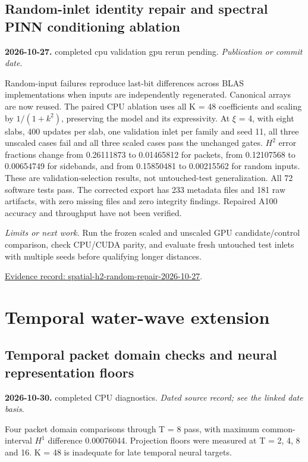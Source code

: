 \documentclass[11pt]{article}
\begin{document}
\subsection*{Random-inlet identity repair and spectral PINN conditioning ablation}
\noindent\textbf{2026-10-27.} completed cpu validation gpu rerun pending. \emph{Publication or commit date}.\par
Random-input failures reproduce last-bit differences across BLAS implementations when inputs are independently regenerated. Canonical arrays are now reused. The paired CPU ablation uses all K = 48 coefficients and scaling by $1/(1+k^2)$, preserving the model and its expressivity. At $\xi$ = 4, with eight slabs, 400 updates per slab, one validation inlet per family and seed 11, all three unscaled cases fail and all three scaled cases pass the unchanged gates. $H^2$ error fractions change from 0.26111873 to 0.01465812 for packets, from 0.12107568 to 0.00654749 for sidebands, and from 0.15850481 to 0.00215562 for random inputs. These are validation-selection results, not untouched-test generalization. All 72 software tests pass. The corrected export has 233 metadata files and 181 raw artifacts, with zero missing files and zero integrity findings. Repaired A100 accuracy and throughput have not been verified.

\noindent\textit{Limits or next work.} Run the frozen scaled and unscaled GPU candidate/control comparison, check CPU/CUDA parity, and evaluate fresh untouched test inlets with multiple seeds before qualifying longer distances.

\noindent\href{https://github.com/matasvai/dysthe-paper/blob/codex/research-record-2026-11-05/research-record/2026-11-05/README.md#spatial-h2-random-repair-2026-10-27}{Evidence record: spatial-h2-random-repair-2026-10-27}.

\section{Temporal water-wave extension}
\subsection*{Temporal packet domain checks and neural representation floors}
\noindent\textbf{2026-10-30.} completed CPU diagnostics. \emph{Dated source record; see the linked date basis}.\par
Four packet domain comparisons through T = 8 pass, with maximum common-interval $H^1$ difference 0.00076044. Projection floors were measured at T = 2, 4, 8 and 16. K = 48 is inadequate for late temporal neural targets.
\end{document}
